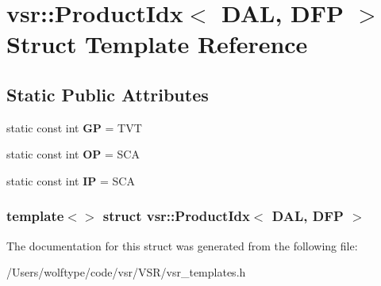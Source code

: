 \hypertarget{structvsr_1_1_product_idx_3_01_d_a_l_00_01_d_f_p_01_4}{\section{vsr\-:\-:Product\-Idx$<$ D\-A\-L, D\-F\-P $>$ Struct Template Reference}
\label{structvsr_1_1_product_idx_3_01_d_a_l_00_01_d_f_p_01_4}
}
\subsection*{Static Public Attributes}
\begin{DoxyCompactItemize}
\item 
\hypertarget{structvsr_1_1_product_idx_3_01_d_a_l_00_01_d_f_p_01_4_ac06ad4b7b6c8e99b8fb2d1a903c4ada4}{static const int {\bfseries G\-P} = T\-V\-T}\label{structvsr_1_1_product_idx_3_01_d_a_l_00_01_d_f_p_01_4_ac06ad4b7b6c8e99b8fb2d1a903c4ada4}

\item 
\hypertarget{structvsr_1_1_product_idx_3_01_d_a_l_00_01_d_f_p_01_4_a60111749e546c83406be5ef061f571f9}{static const int {\bfseries O\-P} = S\-C\-A}\label{structvsr_1_1_product_idx_3_01_d_a_l_00_01_d_f_p_01_4_a60111749e546c83406be5ef061f571f9}

\item 
\hypertarget{structvsr_1_1_product_idx_3_01_d_a_l_00_01_d_f_p_01_4_a9cb1afa43c91f4a21f31796c5d0ba691}{static const int {\bfseries I\-P} = S\-C\-A}\label{structvsr_1_1_product_idx_3_01_d_a_l_00_01_d_f_p_01_4_a9cb1afa43c91f4a21f31796c5d0ba691}

\end{DoxyCompactItemize}
\subsubsection*{template$<$$>$ struct vsr\-::\-Product\-Idx$<$ D\-A\-L, D\-F\-P $>$}



The documentation for this struct was generated from the following file\-:\begin{DoxyCompactItemize}
\item 
/\-Users/wolftype/code/vsr/\-V\-S\-R/vsr\-\_\-templates.\-h\end{DoxyCompactItemize}

